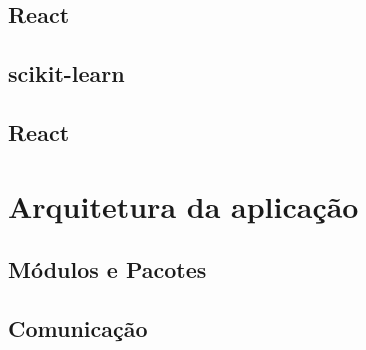 \subsection{React}
\subsection{scikit-learn}
\subsection{React}

\section{Arquitetura da aplicação}
\subsection{Módulos e Pacotes}
\subsection{Comunicação}